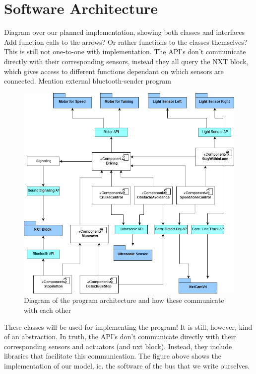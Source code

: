 
\section{Software Architecture}

Diagram over our planned implementation, showing both classes and interfaces
Add function calls to the arrows? Or rather functions to the classes themselves?
This is still not one-to-one with implementation. The API's don't communicate directly with their corresponding sensors, instead they all query the NXT block, which gives access to different functions dependant on which sensors are connected.
Mention external bluetooth-sender program

\begin{figure}[h]
    \includegraphics[width=\textwidth]{Images/Design/architectureClassDiagram.png}
    \caption{Diagram of the program architecture and how these communicate with each other}
    \label{give label}
\end{figure}

These classes will be used for implementing the program! It is still, however, kind of an abstraction.
In truth, the API's don't communicate directly with their corresponding sensors and actuators (and nxt block). 
Instead, they include libraries that facilitate this communication. 
The figure above shows the implementation of our model, ie. the software of the bus that we write ourselves.

